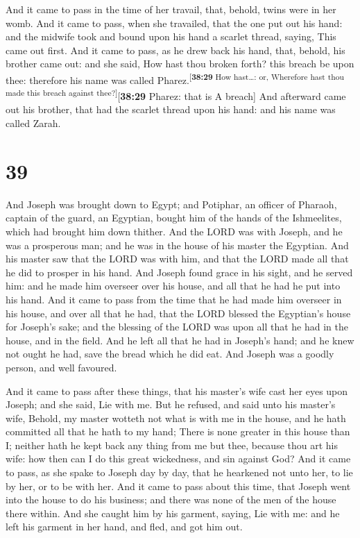  And it came to pass in the time of her travail, that,
behold, twins were in her womb.  And it came to pass,
when she travailed, that the one put out his hand: and the midwife took
and bound upon his hand a scarlet thread, saying, This came out first.
 And it came to pass, as he drew back his hand, that,
behold, his brother came out: and she said, How hast thou broken forth?
this breach be upon thee: therefore his name was called
Pharez.\textsuperscript{{[}\textbf{38:29} How hast\ldots: or, Wherefore
hast thou made this breach against thee?{]}}{[}\textbf{38:29} Pharez:
that is A breach{]}  And afterward came out his brother,
that had the scarlet thread upon his hand: and his name was called
Zarah.

\hypertarget{section-38}{%
\section{39}\label{section-38}}

 And Joseph was brought down to Egypt; and Potiphar, an
officer of Pharaoh, captain of the guard, an Egyptian, bought him of the
hands of the Ishmeelites, which had brought him down thither.
 And the LORD was with Joseph, and he was a prosperous
man; and he was in the house of his master the Egyptian. 
And his master saw that the LORD was with him, and that the LORD made
all that he did to prosper in his hand.  And Joseph found
grace in his sight, and he served him: and he made him overseer over his
house, and all that he had he put into his hand.  And it
came to pass from the time that he had made him overseer in his house,
and over all that he had, that the LORD blessed the Egyptian's house for
Joseph's sake; and the blessing of the LORD was upon all that he had in
the house, and in the field.  And he left all that he had
in Joseph's hand; and he knew not ought he had, save the bread which he
did eat. And Joseph was a goodly person, and well favoured.

 And it came to pass after these things, that his master's
wife cast her eyes upon Joseph; and she said, Lie with me.
 But he refused, and said unto his master's wife, Behold,
my master wotteth not what is with me in the house, and he hath
committed all that he hath to my hand;  There is none
greater in this house than I; neither hath he kept back any thing from
me but thee, because thou art his wife: how then can I do this great
wickedness, and sin against God?  And it came to pass, as
she spake to Joseph day by day, that he hearkened not unto her, to lie
by her, or to be with her.  And it came to pass about
this time, that Joseph went into the house to do his business; and there
was none of the men of the house there within.  And she
caught him by his garment, saying, Lie with me: and he left his garment
in her hand, and fled, and got him out.

